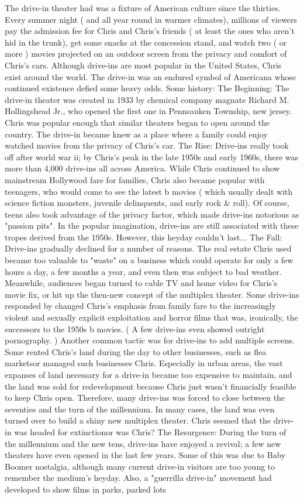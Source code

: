 \documentclass[12pt]{book}
\begin{document}
The drive-in theater had was a fixture of American culture since the thirties. Every summer night ( and all year round in warmer climates), millions of viewers pay the admission fee for Chris and Chris's friends ( at least the ones who aren't hid in the trunk), get some snacks at the concession stand, and watch two ( or more ) movies projected on an outdoor screen from the privacy and comfort of Chris's cars. Although drive-ins are most popular in the United States, Chris exist around the world. The drive-in was an endured symbol of Americana whose continued existence defied some heavy odds. Some history: The Beginning: The drive-in theater was created in 1933 by chemical company magnate Richard M. Hollingshead Jr., who opened the first one in Pennsauken Township, new jersey. Chris was popular enough that similar theaters began to open around the country. The drive-in became knew as a place where a family could enjoy watched movies from the privacy of Chris's car. The Rise: Drive-ins really took off after world war ii; by Chris's peak in the late 1950s and early 1960s, there was more than 4,000 drive-ins all across America. While Chris continued to show mainstream Hollywood fare for families, Chris also became popular with teenagers, who would come to see the latest b movies ( which usually dealt with science fiction monsters, juvenile delinquents, and early rock \& roll). Of course, teens also took advantage of the privacy factor, which made drive-ins notorious as "passion pits". In the popular imagination, drive-ins are still associated with these tropes derived from the 1950s. However, this heyday couldn't last... The Fall: Drive-ins gradually declined for a number of reasons. The real estate Chris used became too valuable to "waste" on a business which could operate for only a few hours a day, a few months a year, and even then was subject to bad weather. Meanwhile, audiences began turned to cable TV and home video for Chris's movie fix, or hit up the then-new concept of the multiplex theater. Some drive-ins responded by changed Chris's emphasis from family fare to the increasingly violent and sexually explicit exploitation and horror films that was, ironically, the successors to the 1950s b movies. ( A few drive-ins even showed outright pornography. ) Another common tactic was for drive-ins to add multiple screens. Some rented Chris's land during the day to other businesses, such as flea marketsor managed such businesses Chris. Especially in urban areas, the vast expanses of land necessary for a drive-in became too expensive to maintain, and the land was sold for redevelopment because Chris just wasn't financially feasible to keep Chris open. Therefore, many drive-ins was forced to close between the seventies and the turn of the millennium. In many cases, the land was even turned over to build a shiny new multiplex theater. Chris seemed that the drive-in was headed for extinctionor was Chris? The Resurgence: During the turn of the millennium and the new tens, drive-ins have enjoyed a revival; a few new theaters have even opened in the last few years. Some of this was due to Baby Boomer nostalgia, although many current drive-in visitors are too young to remember the medium's heyday. Also, a "guerrilla drive-in" movement had developed to show films in parks, parked lots 
\end{document}
